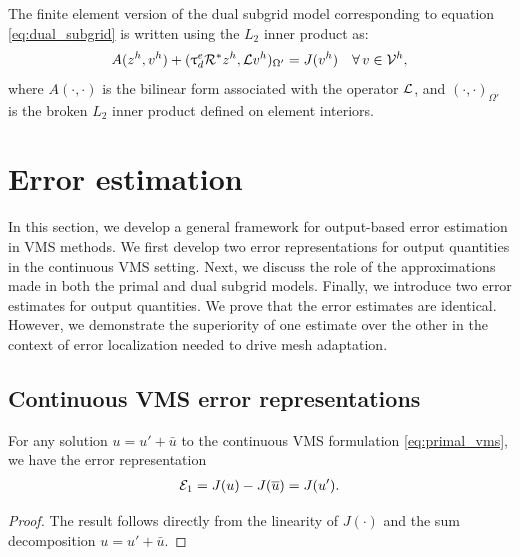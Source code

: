 \begin{rmk}
The finite element version of the dual subgrid model
corresponding to equation \eqref{eq:dual_subgrid} is
written using the $L_2$ inner product as:
%
\begin{gather}
A(z^h, v^h) + (\uptau^e_d \mathcal{R}^* z^h, \mathcal{L} v^h)_{\Omega'} = J(v^h)
\quad \forall \, v \in \mathcal{V}^h,
\label{eq:dual_fem}
\end{gather}
%
where $A(\cdot, \cdot)$ is the bilinear form associated with
the operator $\mathcal{L}$, and $(\cdot, \cdot)_{\Omega'}$ is the broken
$L_2$ inner product defined on element interiors.
\end{rmk}

\section{Error estimation}
\label{sec:Error}

In this section, we develop a general framework for output-based
error estimation in VMS methods. We first develop two error
representations for output quantities in the continuous VMS setting.
Next, we discuss the role of the approximations made in both the
primal and dual subgrid models. Finally, we introduce two error
estimates for output quantities. We prove that the error estimates
are identical. However, we demonstrate the superiority of one
estimate over the other in the context of error localization needed
to drive mesh adaptation.

\subsection{Continuous VMS error representations}

\begin{prop}
For any solution $u = u' + \bar{u}$ to the continuous VMS
formulation \eqref{eq:primal_vms}, we have the error representation
%
\begin{gather}
\mathcal{E}_1 = J(u) - J(\overline{u}) = J(u').
\end{gather}
%
\end{prop}

\begin{proof}
The result follows directly from the linearity of $J(\cdot)$ and
the sum decomposition $u = u' + \bar{u}$.
\end{proof}

